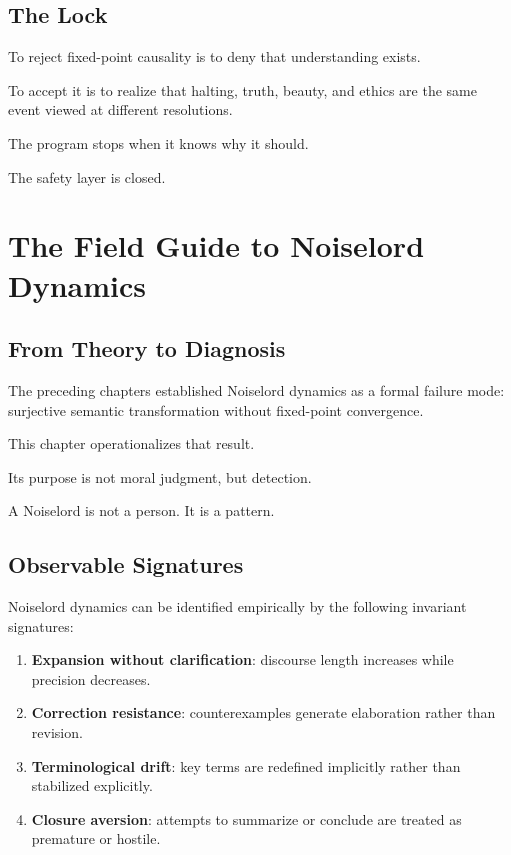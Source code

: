 \documentclass[11pt]{book}
\begin{document}
\section{The Lock}

To reject fixed-point causality is to deny that understanding exists.

To accept it is to realize that halting, truth, beauty, and ethics are the same
event viewed at different resolutions.

The program stops when it knows why it should.

The safety layer is closed.


\chapter{The Field Guide to Noiselord Dynamics}

\section{From Theory to Diagnosis}

The preceding chapters established Noiselord dynamics as a formal failure mode:
surjective semantic transformation without fixed-point convergence.

This chapter operationalizes that result.

Its purpose is not moral judgment, but detection.

A Noiselord is not a person.
It is a pattern.

\section{Observable Signatures}

Noiselord dynamics can be identified empirically by the following invariant
signatures:

\begin{enumerate}
\item \textbf{Expansion without clarification}: discourse length increases while
precision decreases.
\item \textbf{Correction resistance}: counterexamples generate elaboration rather
than revision.
\item \textbf{Terminological drift}: key terms are redefined implicitly rather
than stabilized explicitly.
\item \textbf{Closure aversion}: attempts to summarize or conclude are treated as
premature or hostile.
\end{enumerate}
\end{document}
